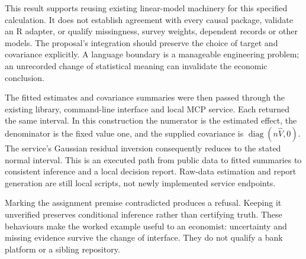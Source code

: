 This result supports reusing existing linear-model machinery for this
specified calculation. It does not establish agreement with every causal
package, validate an R adapter, or qualify missingness, survey weights,
dependent records or other models. The proposal's integration should preserve
the choice of target and covariance explicitly. A language boundary is a
manageable engineering problem; an unrecorded change of statistical meaning
can invalidate the economic conclusion.

The fitted estimates and covariance summaries were then passed through the
existing library, command-line interface and local MCP service. Each returned
the same interval. In this construction the numerator is the estimated effect,
the denominator is the fixed value one, and the supplied covariance is
$\operatorname{diag}(n\widehat V,0)$. The service's Gaussian residual
inversion consequently reduces to the stated normal interval. This is an
executed path from public data to fitted summaries to consistent inference
and a local decision report. Raw-data estimation and report generation are
still local scripts, not newly implemented service endpoints.

Marking the assignment premise contradicted produces a refusal. Keeping it
unverified preserves conditional inference rather than certifying truth.
These behaviours make the worked example useful to an economist: uncertainty
and missing evidence survive the change of interface. They do not qualify a
bank platform or a sibling repository.

